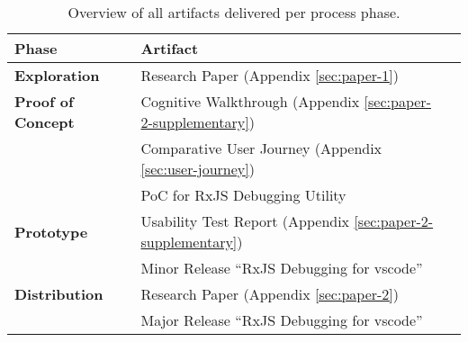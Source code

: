 
\begin{table}[H]
  \centering
  \caption{Overview of all artifacts delivered per process phase. \label{tbl:artifact-overview}}

  \newcommand\Tstrut{\rule{0pt}{2.6ex}}       %
  \newcommand\Bstrut{\rule[-0.9ex]{0pt}{0pt}} %
  \newcommand{\TBstrut}{\Tstrut\Bstrut} %

  \begin{tabular}{llp{7.37cm}}
    \small{\textbf{Phase}}             & \small{\textbf{Artifact}}                                                 \TBstrut \\
    \hline
    \small{\textbf{Exploration}}       & \small{Research Paper (Appendix \ref{sec:paper-1})}                       \TBstrut \\
    \hline
    \small{\textbf{Proof of Concept}}  & \small{Cognitive Walkthrough (Appendix \ref{sec:paper-2-supplementary})}  \TBstrut \\
                                       & \small{Comparative User Journey (Appendix \ref{sec:user-journey})}        \Bstrut  \\
                                       & \small{PoC for RxJS Debugging Utility}                                    \Bstrut \\
    \hline
    \small{\textbf{Prototype}}         & \small{Usability Test Report (Appendix \ref{sec:paper-2-supplementary})}  \TBstrut  \\
                                       & \small{Minor Release ``RxJS Debugging for vscode''}                       \Bstrut \\
    \hline
    \small{\textbf{Distribution}}      & \small{Research Paper (Appendix \ref{sec:paper-2})}                       \TBstrut  \\
                                       & \small{Major Release ``RxJS Debugging for vscode''}                       \Bstrut \\
    \hline
  \end{tabular}
\end{table}
